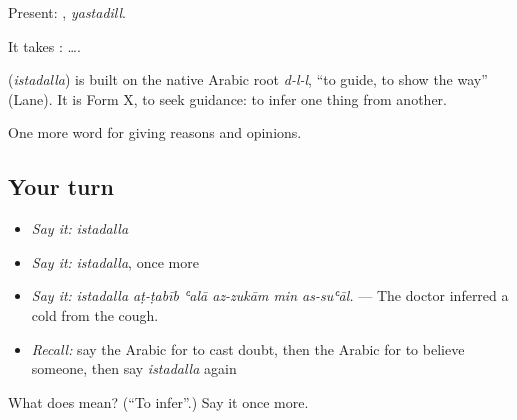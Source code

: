 Present: , \emph{yastadill}.

It takes :   ….

\begin{cousinweb}
\textbf{} (\emph{istadalla}) is built on the native Arabic root \emph{d-l-l}, \textquotedblleft{}to guide, to show the way\textquotedblright{} (Lane). It is Form X, to seek guidance: to infer one thing from another.
\end{cousinweb}

\begin{grammarlens}[title={What you've built}]
One more word for giving reasons and opinions.
\end{grammarlens}

\subsection*{Your turn}
\begin{itemize}
\raggedright
  \item \emph{Say it:} \emph{istadalla}
  \item \emph{Say it:} \emph{istadalla}, once more
  \item \emph{Say it:} \emph{istadalla aṭ-ṭabīb ʿalā az-zukām min as-suʿāl.} — The doctor inferred a cold from the cough.
  \item \emph{Recall:} say the Arabic for to cast doubt, then the Arabic for to believe someone, then say \emph{istadalla} again
\end{itemize}

\begin{tcolorbox}[breakable,colback=teal!4,colframe=teal!35!black,title={Before you move on}]
What does  mean? (\textquotedblleft{}To infer\textquotedblright{}.) Say it once more.
\end{tcolorbox}
